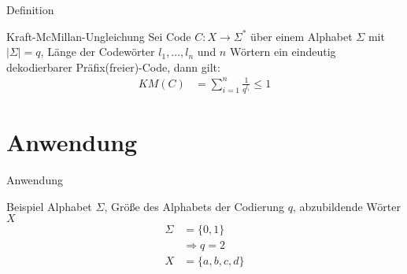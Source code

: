 \documentclass{beamer}
\begin{document}
\begin{frame}{Definition}

\begin{center}
\begin{minipage}{.9\textwidth}
\begin{block}{Kraft-McMillan-Ungleichung}
Sei Code $C:X \rightarrow \Sigma^{*}$ über einem Alphabet $\Sigma$ mit $|\Sigma| = q$, Länge der Codewörter $ l_{1},...,l_{n}$ und $n$ Wörtern ein eindeutig dekodierbarer Präfix(freier)-Code, dann gilt: \pause
\begin{align*}
KM(C)&= \sum_{i=1}^{n} \frac{1}{q^{l_{i}}} \leq 1
\end{align*}
\end{block}
\end{minipage}
\end{center}

\end{frame}

\section{Anwendung}

\begin{frame}{Anwendung}
\begin{center}
\begin{minipage}{.8\textwidth}
\begin{block}{Beispiel}
Alphabet $\Sigma$, Größe des Alphabets der Codierung $q$, abzubildende Wörter $X$\pause
\begin{align*}
\Sigma & = \{0,1\} \\
& \Rightarrow q = 2\\
X & = \{a, b, c, d\}
\end{align*}
\end{block}
\end{minipage}
\end{center}

\end{frame}
\end{document}
